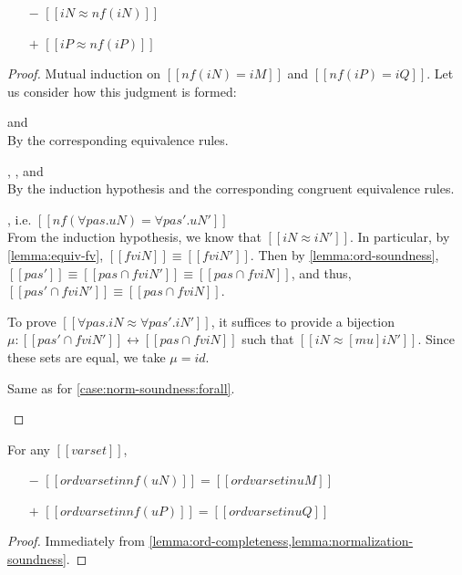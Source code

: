 \begin{lemma}
  \label{lemma:normalization-soundness}
  \hfill

  \begin{itemize}
    \item[$-$] $[[iN ≈ nf(iN)]]$
    \item[$+$] $[[iP ≈ nf(iP)]]$
  \end{itemize}
\end{lemma}
\begin{proof}
  Mutual induction on $[[nf(iN) = iM]]$ and $[[nf(iP) = iQ]]$.
  Let us consider how this judgment is formed:
  \begin{caseof}
    \item{\nameref{\ottdruleNrmNVarLabel} and \nameref{\ottdruleNrmPVarLabel}}\\ By
      the corresponding equivalence rules.
    \item{\nameref{\ottdruleNrmShiftULabel}, \nameref{\ottdruleNrmShiftDLabel},
        and \nameref{\ottdruleNrmArrowLabel}}\\
      By the induction hypothesis and the corresponding congruent equivalence rules.
    \item{\nameref{\ottdruleNrmForallLabel}}, i.e. $[[nf(∀pas.uN) = ∀pas'.uN']]$ \label{case:norm-soundness:forall}\\
      From the induction hypothesis, we
      know that $[[iN ≈ iN']]$. In particular, by \cref{lemma:equiv-fv}, $[[fv
        iN]] \equiv [[fv iN']]$.
      Then by \cref{lemma:ord-soundness}, $[[{pas'}]]
      \equiv [[{pas} ∩ fv iN']] \equiv [[{pas} ∩ fv iN]]$, and thus,
      $[[{pas'} ∩ fv iN']] \equiv [[{pas} ∩ fv iN]]$.
      
      To prove $[[∀pas.iN ≈ ∀pas'.iN']]$, it suffices to provide a bijection 
      $\mu : [[{pas'} ∩ fv iN']] \leftrightarrow [[{pas} ∩ fv iN]]$ such that
      $[[iN ≈ [mu]iN']]$. Since these sets are equal, we take $\mu = id$.
    \item{\nameref{\ottdruleNrmExistsLabel}} Same as for \cref{case:norm-soundness:forall}.
  \end{caseof}
\end{proof}

\begin{corollary}
  \label{corollary:normalization-ord}
  For any $[[varset]]$,
  \begin{itemize}
  \item[$-$] $[[ord varset in nf(uN)]] = [[ord varset in uM]]$
  \item[$+$] $[[ord varset in nf(uP)]] = [[ord varset in uQ]]$
  \end{itemize}
\end{corollary}
\begin{proof}
  Immediately from \cref{lemma:ord-completeness,lemma:normalization-soundness}.
\end{proof}

